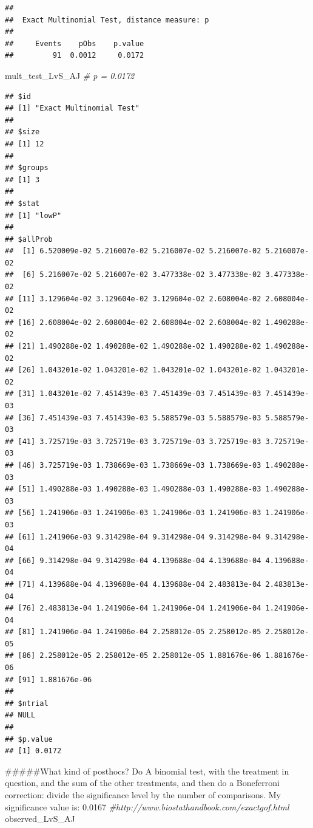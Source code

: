 \documentclass[]{article}
\newenvironment{Shaded}{\begin{snugshade}}{\end{snugshade}}
\newcommand{\CommentTok}[1]{\textcolor[rgb]{0.56,0.35,0.01}{\textit{{#1}}}}
\newcommand{\NormalTok}[1]{{#1}}
\begin{document}
\begin{verbatim}
## 
##  Exact Multinomial Test, distance measure: p
## 
##     Events    pObs    p.value
##         91  0.0012     0.0172
\end{verbatim}

\begin{Shaded}
\begin{Highlighting}[]
\NormalTok{mult_test_LvS_AJ }\CommentTok{# p = 0.0172}
\end{Highlighting}
\end{Shaded}

\begin{verbatim}
## $id
## [1] "Exact Multinomial Test"
## 
## $size
## [1] 12
## 
## $groups
## [1] 3
## 
## $stat
## [1] "lowP"
## 
## $allProb
##  [1] 6.520009e-02 5.216007e-02 5.216007e-02 5.216007e-02 5.216007e-02
##  [6] 5.216007e-02 5.216007e-02 3.477338e-02 3.477338e-02 3.477338e-02
## [11] 3.129604e-02 3.129604e-02 3.129604e-02 2.608004e-02 2.608004e-02
## [16] 2.608004e-02 2.608004e-02 2.608004e-02 2.608004e-02 1.490288e-02
## [21] 1.490288e-02 1.490288e-02 1.490288e-02 1.490288e-02 1.490288e-02
## [26] 1.043201e-02 1.043201e-02 1.043201e-02 1.043201e-02 1.043201e-02
## [31] 1.043201e-02 7.451439e-03 7.451439e-03 7.451439e-03 7.451439e-03
## [36] 7.451439e-03 7.451439e-03 5.588579e-03 5.588579e-03 5.588579e-03
## [41] 3.725719e-03 3.725719e-03 3.725719e-03 3.725719e-03 3.725719e-03
## [46] 3.725719e-03 1.738669e-03 1.738669e-03 1.738669e-03 1.490288e-03
## [51] 1.490288e-03 1.490288e-03 1.490288e-03 1.490288e-03 1.490288e-03
## [56] 1.241906e-03 1.241906e-03 1.241906e-03 1.241906e-03 1.241906e-03
## [61] 1.241906e-03 9.314298e-04 9.314298e-04 9.314298e-04 9.314298e-04
## [66] 9.314298e-04 9.314298e-04 4.139688e-04 4.139688e-04 4.139688e-04
## [71] 4.139688e-04 4.139688e-04 4.139688e-04 2.483813e-04 2.483813e-04
## [76] 2.483813e-04 1.241906e-04 1.241906e-04 1.241906e-04 1.241906e-04
## [81] 1.241906e-04 1.241906e-04 2.258012e-05 2.258012e-05 2.258012e-05
## [86] 2.258012e-05 2.258012e-05 2.258012e-05 1.881676e-06 1.881676e-06
## [91] 1.881676e-06
## 
## $ntrial
## NULL
## 
## $p.value
## [1] 0.0172
\end{verbatim}

\begin{Shaded}
\begin{Highlighting}[]
\NormalTok{#####What kind of posthocs? Do A binomial test, with the treatment in question, and the sum of the other treatments, and then do a Boneferroni correction: divide the significance level by the number of comparisons. My significance value is: 0.0167}
\CommentTok{#http://www.biostathandbook.com/exactgof.html}
\NormalTok{observed_LvS_AJ}
\end{Highlighting}
\end{Shaded}
\end{document}
